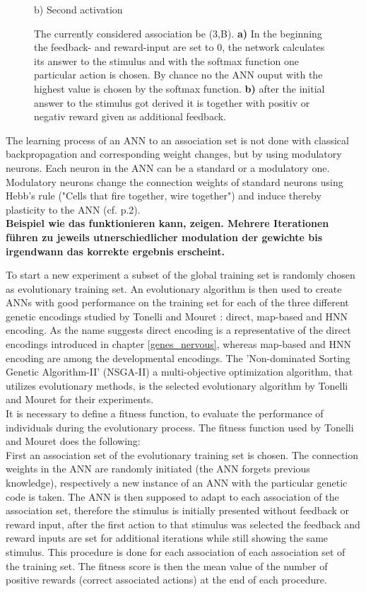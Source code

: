 \documentclass[12pt,twoside]{article}
\theoremstyle{plain}
\theoremstyle{definition}
\theoremstyle{remark}
\begin{document}
\begin{figure}[!tbp]
\begin{minipage}[b]{0.4\textwidth}
		\captionsetup{labelformat=empty}
		\caption*{b) Second activation}
	\end{minipage}	
	\caption{The currently considered association be (3,B). \textbf{a)} In the beginning the feedback- and reward-input are set to 0, the network calculates its answer to the stimulus and with the softmax function one particular action is chosen. By chance no the ANN ouput with the highest value is chosen by the softmax function. \textbf{b)} after the initial answer to the stimulus got derived it is together with positiv or negativ reward given as additional feedback.}
	\label{fig:input}
\end{figure}

The learning process of an ANN to an association set is not done with classical backpropagation and corresponding weight changes, but by using modulatory neurons.
Each neuron in the ANN can be a standard or a modulatory one.
Modulatory neurons change the connection weights of standard neurons using Hebb's rule ("Cells that fire together, wire together") and induce thereby plasticity to the ANN (cf. \cite{citeulike:12788284} p.2).\\
\textbf{Beispiel wie das funktionieren kann, zeigen. Mehrere Iterationen führen zu jeweils utnerschiedlicher modulation der gewichte bis irgendwann das korrekte ergebnis erscheint.} \medskip

To start a new experiment a subset of the global training set is randomly chosen as evolutionary training set.
An evolutionary algorithm is then used to create ANNs with good performance on the training set for each of the three different genetic encodings studied by Tonelli and Mouret : direct, map-based and HNN encoding. As the name suggests direct encoding is a representative of the direct encodings introduced in chapter \ref{genes_nervous}, whereas map-based and HNN encoding are among the developmental encodings.
The 'Non-dominated Sorting Genetic Algorithm-II' (NSGA-II) a multi-objective optimization algorithm, that utilizes evolutionary methods, is the selected evolutionary algorithm by Tonelli and Mouret for their experiments.\\
It is necessary to define a fitness function, to evaluate the performance of individuals during the evolutionary process. The fitness function used by Tonelli and Mouret does the following:\\
First an association set of the evolutionary training set is chosen. The connection weights in the ANN are randomly initiated (the ANN forgets previous knowledge), respectively a new instance of an ANN with the particular genetic code is taken. The ANN is then supposed to adapt to each association of the association set, therefore the stimulus is initially presented without feedback or reward input, after the first action to that stimulus was selected the feedback and reward inputs are set for additional iterations while still showing the same stimulus. This procedure is done for each association of each association set of the training set. The fitness score is then the mean value of the number of positive rewards (correct associated actions) at the end of each procedure.\medskip
\end{document}
